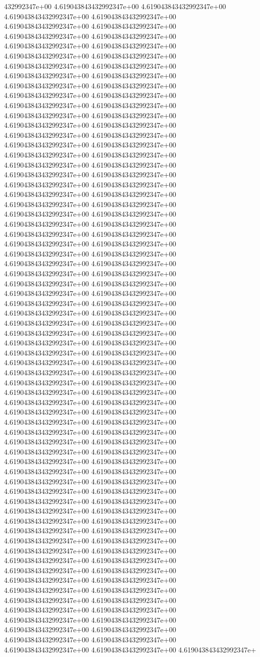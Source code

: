 432992347e+00	4.619043843432992347e+00	4.619043843432992347e+00	4.619043843432992347e+00	4.619043843432992347e+00	4.619043843432992347e+00	4.619043843432992347e+00	4.619043843432992347e+00	4.619043843432992347e+00	4.619043843432992347e+00	4.619043843432992347e+00	4.619043843432992347e+00	4.619043843432992347e+00	4.619043843432992347e+00	4.619043843432992347e+00	4.619043843432992347e+00	4.619043843432992347e+00	4.619043843432992347e+00	4.619043843432992347e+00	4.619043843432992347e+00	4.619043843432992347e+00	4.619043843432992347e+00	4.619043843432992347e+00	4.619043843432992347e+00	4.619043843432992347e+00	4.619043843432992347e+00	4.619043843432992347e+00	4.619043843432992347e+00	4.619043843432992347e+00	4.619043843432992347e+00	4.619043843432992347e+00	4.619043843432992347e+00	4.619043843432992347e+00	4.619043843432992347e+00	4.619043843432992347e+00	4.619043843432992347e+00	4.619043843432992347e+00	4.619043843432992347e+00	4.619043843432992347e+00	4.619043843432992347e+00	4.619043843432992347e+00	4.619043843432992347e+00	4.619043843432992347e+00	4.619043843432992347e+00	4.619043843432992347e+00	4.619043843432992347e+00	4.619043843432992347e+00	4.619043843432992347e+00	4.619043843432992347e+00	4.619043843432992347e+00	4.619043843432992347e+00	4.619043843432992347e+00	4.619043843432992347e+00	4.619043843432992347e+00	4.619043843432992347e+00	4.619043843432992347e+00	4.619043843432992347e+00	4.619043843432992347e+00	4.619043843432992347e+00	4.619043843432992347e+00	4.619043843432992347e+00	4.619043843432992347e+00	4.619043843432992347e+00	4.619043843432992347e+00	4.619043843432992347e+00	4.619043843432992347e+00	4.619043843432992347e+00	4.619043843432992347e+00	4.619043843432992347e+00	4.619043843432992347e+00	4.619043843432992347e+00	4.619043843432992347e+00	4.619043843432992347e+00	4.619043843432992347e+00	4.619043843432992347e+00	4.619043843432992347e+00	4.619043843432992347e+00	4.619043843432992347e+00	4.619043843432992347e+00	4.619043843432992347e+00	4.619043843432992347e+00	4.619043843432992347e+00	4.619043843432992347e+00	4.619043843432992347e+00	4.619043843432992347e+00	4.619043843432992347e+00	4.619043843432992347e+00	4.619043843432992347e+00	4.619043843432992347e+00	4.619043843432992347e+00	4.619043843432992347e+00	4.619043843432992347e+00	4.619043843432992347e+00	4.619043843432992347e+00	4.619043843432992347e+00	4.619043843432992347e+00	4.619043843432992347e+00	4.619043843432992347e+00	4.619043843432992347e+00	4.619043843432992347e+00	4.619043843432992347e+00	4.619043843432992347e+00	4.619043843432992347e+00	4.619043843432992347e+00	4.619043843432992347e+00	4.619043843432992347e+00	4.619043843432992347e+00	4.619043843432992347e+00	4.619043843432992347e+00	4.619043843432992347e+00	4.619043843432992347e+00	4.619043843432992347e+00	4.619043843432992347e+00	4.619043843432992347e+00	4.619043843432992347e+00	4.619043843432992347e+00	4.619043843432992347e+00	4.619043843432992347e+00	4.619043843432992347e+00	4.619043843432992347e+00	4.619043843432992347e+00	4.619043843432992347e+00	4.619043843432992347e+00	4.619043843432992347e+00	4.619043843432992347e+00	4.619043843432992347e+00	4.619043843432992347e+00	4.619043843432992347e+00	4.619043843432992347e+00	4.619043843432992347e+00	4.619043843432992347e+00	4.619043843432992347e+00	4.619043843432992347e+00	4.619043843432992347e+